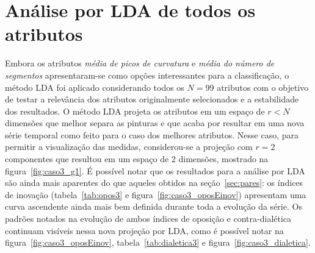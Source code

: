 \clearpage
\section{Análise por LDA de todos os atributos}
\label{subsec:lda}

Embora os atributos \emph{média de picos de curvatura} e \emph{média
  do número de segmentos} apresentaram-se como opções interessantes
para a classificação, o método LDA foi aplicado considerando todos os
$N = 99$ atributos com o objetivo de testar a relevância dos atributos
originalmente selecionados e a estabilidade dos resultados. O método
LDA projeta os atributos em um espaço de $r < N$ dimensões que melhor
separa as pinturas e que acaba por resultar em uma nova série temporal
como feito para o caso dos melhores atributos. Nesse caso, para
permitir a visualização das medidas, considerou-se a projeção com $r =
2$ componentes que resultou em um espaço de 2 dimensões, mostrado na
figura~\ref{fig:caso3_g1}. É possível notar que os resultados para a
análise por LDA são ainda mais aparentes do que aqueles obtidos na
seção~\ref{sec:pares}: os índices de inovação
(tabela~\ref{tab:opos3} e figura~\ref{fig:caso3_oposEinov}) apresentam uma curva ascendente
ainda mais bem definida durante toda a evolução da série. Os padrões
notados na evolução de ambos índices de oposição e contra-dialética
continuam visíveis nessa nova projeção por LDA, como é possível notar
na figura~\ref{fig:caso3_oposEinov}, tabela~\ref{tab:dialetica3} e figura~\ref{fig:caso3_dialetica}.


